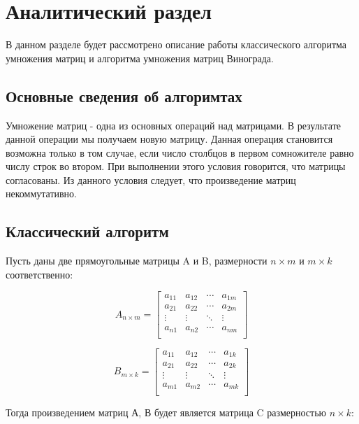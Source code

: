 \chapter{Аналитический раздел}
В данном разделе будет рассмотрено описание работы классического алгоритма умножения матриц и алгоритма умножения матриц Винограда.

\section{Основные сведения об алгоримтах}
Умножение матриц - одна из основных операций над матрицами. В результате данной операции мы получаем новую матрицу. Данная операция становится возможна только в том случае, если число столбцов в первом сомножителе равно числу строк во втором. При выполнении этого условия говорится, что матрицы согласованы. Из данного условия следует, что произведение матриц некоммутативно.

\section{Классический алгоритм}
Пусть даны две прямоугольные матрицы A и B, размерности $n\times m$ и $m\times k$ соответственно:

\begin{equation}
  A_{n\times m} =
  \left[ {\begin{array}{cccc}
    a_{11} & a_{12} & \cdots & a_{1m}\\
    a_{21} & a_{22} & \cdots & a_{2m}\\
    \vdots & \vdots & \ddots & \vdots\\
    a_{n1} & a_{n2} & \cdots & a_{nm}\\
  \end{array} } \right]
\label{mat_a}
\end{equation}

\begin{equation}
  B_{m\times k} =
  \left[ {\begin{array}{cccc}
    a_{11} & a_{12} & \cdots & a_{1k}\\
    a_{21} & a_{22} & \cdots & a_{2k}\\
    \vdots & \vdots & \ddots & \vdots\\
    a_{m1} & a_{m2} & \cdots & a_{mk}\\
  \end{array} } \right]
\label{mat_b}
\end{equation}

Тогда произведением матриц А, В будет является матрица C размерностью $n \times k$:

